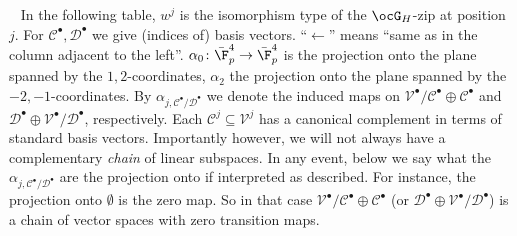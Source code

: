 \documentclass[a4paper]{scrartcl} %
\numberwithin{equation}{section}
\begin{document}
%
\begin{landscape}
  ~\vskip 1.5cm
  In the following table, $w^j$ is the isomorphism type of the $\ocG_H$-zip at position $j$. For $\mathcal{C}^\bullet, \mathcal{D}^\bullet$ we give (indices of) basis vectors. ``$\leftarrow$'' means ``same as in the column adjacent to the left''. $\alpha_0\colon \bar\F_p^4\to \bar\F_p^4$ is the projection onto the plane spanned by the $1,2$-coordinates, $\alpha_2$ the projection onto the plane spanned by the $-2,-1$-coordinates. By $\alpha_{j,\mathcal{C}^\bullet/\mathcal{D}^\bullet}$ we denote the induced maps on $\mathcal{V}^\bullet/\mathcal{C}^\bullet\oplus \mathcal{C}^\bullet$ and $\mathcal{D}^\bullet\oplus \mathcal{V}^\bullet/\mathcal{D}^\bullet$, respectively. Each $\mathcal{C}^j\subseteq \mathcal{V}^j$ has a canonical complement in terms of standard basis vectors. Importantly however, we will not always have a complementary \emph{chain} of linear subspaces. In any event, below we say what the $\alpha_{j,\mathcal{C}^\bullet/\mathcal{D}^\bullet}$ are the projection onto if interpreted as described. For instance, the projection onto $\emptyset$ is the zero map. So in that case $\mathcal{V}^\bullet/\mathcal{C}^\bullet\oplus \mathcal{C}^\bullet$ (or $\mathcal{D}^\bullet\oplus \mathcal{V}^\bullet/\mathcal{D}^\bullet$) is a chain of vector spaces with zero transition maps.


\end{landscape}
\end{document}
